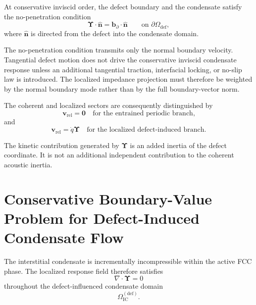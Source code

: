 At conservative inviscid order, the defect boundary and the condensate satisfy the no-penetration condition
\begin{equation}
    \boxed{ \boldsymbol{\Upsilon}\cdot\hat{\mathbf{n}} = \mathbf{b}_{\partial}\cdot\hat{\mathbf{n}} \qquad \text{on } \partial\Omega_{\mathrm{def}} },
\end{equation}
where $\hat{\mathbf{n}}$ is directed from the defect into the condensate domain.

The no-penetration condition transmits only the normal boundary velocity. Tangential defect motion does not drive the conservative inviscid condensate response unless an additional tangential traction, interfacial locking, or no-slip law is introduced. The localized impedance projection must therefore be weighted by the normal boundary mode rather than by the full boundary-vector norm.

The coherent and localized sectors are consequently distinguished by
\begin{equation}
    \mathbf{v}_{\mathrm{rel}} = \mathbf{0} \quad \text{for the entrained periodic branch,}
\end{equation}
and
\begin{equation}
    \mathbf{v}_{\mathrm{rel}} = \dot{q}\boldsymbol{\Upsilon} \quad \text{for the localized defect-induced branch.}
\end{equation}

The kinetic contribution generated by $\boldsymbol{\Upsilon}$ is an added inertia of the defect coordinate. It is not an additional independent contribution to the coherent acoustic inertia.

\section{Conservative Boundary-Value Problem for Defect-Induced Condensate Flow}
\label{sec:AP_defect_boundary_value_problem}

The interstitial condensate is incrementally incompressible within the active FCC phase. The localized response field therefore satisfies
\begin{equation}
    \nabla\cdot\boldsymbol\Upsilon = 0
\end{equation}
throughout the defect-influenced condensate domain
\begin{equation}
    \Omega_{\mathrm{IC}}^{(\mathrm{def})}.
\end{equation}

